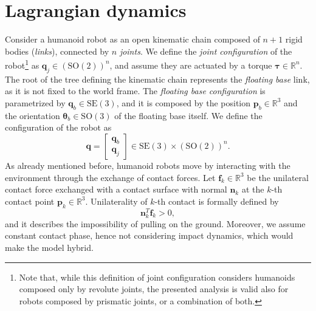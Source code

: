 \section{Lagrangian dynamics}
\label{sec:lagrangian-dynamics}
Consider a humanoid robot as an open kinematic chain composed of $n+1$ rigid bodies
(\textit{links}), connected by $n$ \textit{joints}. We define the \textit{joint
configuration} of the robot\footnote{Note that, while this definition of
joint configuration considers
humanoids composed only by revolute joints, the presented analysis is valid also for
robots composed by prismatic joints, or a combination of both.} as $\bm{q}_j \in \left(\mathrm{SO}(2)\right)^n$, and assume they
are actuated by a torque $\bm{\tau} \in \mathbb{R}^n$. The root of the tree defining the
kinematic chain represents the \textit{floating base} link, as it is not fixed to the
world frame. The \textit{floating base configuration} is parametrized by
$\bm{q}_b \in \mathrm{SE}(3)$, and it is composed by the position
$\bm{p}_b \in \mathbb{R}^3$ and the orientation $\bm{\theta}_b \in \mathrm{SO}(3)$
of the floating base itself. We define the configuration of the robot as
\begin{equation*}
    \bm{q} =
    \begin{bmatrix}
        \bm{q}_b \\ \bm{q}_j
    \end{bmatrix} \in \mathrm{SE}(3) \times \left(\mathrm{SO}(2)\right)^{n}.
\end{equation*}
As already mentioned before, humanoid robots move by interacting with the 
environment through the exchange of contact forces. Let $\bm{f}_k \in \mathbb{R}^3$
be the unilateral contact force exchanged with a contact surface
with normal $\bm{n}_k$ at the $k$-th 
contact point $\bm{p}_k\in\mathbb{R}^3$. Unilaterality of $k$-th contact is formally
defined by
\begin{equation*}
    \bm{n}_k^T \bm{f}_k > 0,
\end{equation*}
and it describes the impossibility of pulling on the ground. Moreover, we
assume constant contact phase, hence not considering impact dynamics, which
would make the model hybrid.

